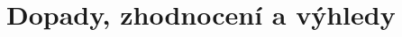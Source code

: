 \documentclass{book}
\begin{document}


\part{Dopady, zhodnocení a výhledy}









%
% 



\printbibliography
\tableofcontents
\end{document}
